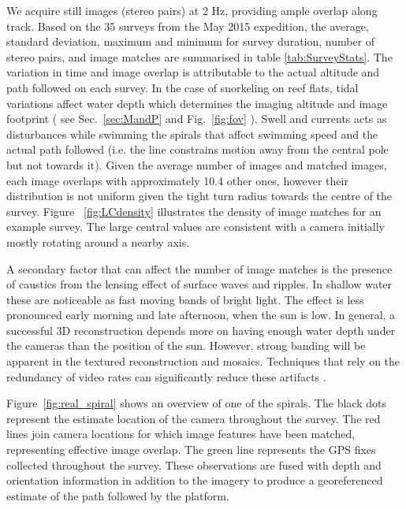 We acquire still images (stereo pairs) at 2 Hz, providing ample overlap along track. Based on the 35 surveys from the May 2015 expedition, the average, standard deviation, maximum and minimum for survey duration, number of stereo pairs, and image matches are summarised in table \ref{tab:SurveyStats}. The variation in time and image overlap is attributable to the actual altitude and path followed on each survey. In the case of snorkeling on reef flats, tidal variations affect water depth which determines the imaging altitude and image footprint ( see Sec.~\ref{sec:MandP} and Fig.~\ref{fig:fov} ). Swell and currents acts as disturbances while swimming the spirals that affect swimming speed and the actual path followed (i.e. the line constrains motion away from the central pole but not towards it). Given the average number of images and matched images, each image overlaps with approximately 10.4 other ones, however their distribution is not uniform given the tight turn radius towards the centre of the survey. Figure ~\ref{fig:LCdensity} illustrates the density of image matches for an example survey. The large central values are consistent with a camera initially mostly rotating around a nearby axis. 

A secondary factor that can affect the number of image matches is the presence of caustics from the lensing effect of surface waves and ripples. In shallow water these are noticeable as fast moving bands of bright light. The effect is less pronounced early morning and late afternoon, when the sun is low. In general, a successful 3D reconstruction depends more on having enough water depth under the cameras than the position of the sun. However, strong banding will be apparent in the textured reconstruction and mosaics. Techniques that rely on the redundancy of video rates can significantly reduce these artifacts \cite{Gracias_2008}.


Figure~\ref{fig:real_spiral} shows an overview of one of the spirals.  The black dots represent the estimate location of the camera throughout the survey.  The red lines join camera locations for which image features have been matched, representing effective image overlap.  The green line represents the GPS fixes collected throughout the survey.  These observations are fused with depth and orientation information in addition to the imagery to produce a georeferenced estimate of the path followed by the platform.